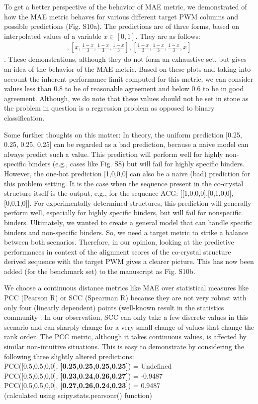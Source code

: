 To get a better perspective of the behavior of MAE metric, we demonstrated of how the MAE metric behaves for various different target PWM columns and possible predictions (Fig. S10a). The predictions are of three forms, based on interpolated values of a variable $x\in[0,1]$. They are as follows: %
\begin{align}
[1-x,0,x,0], [x, \frac{1-x}{3}, \frac{1-x}{3}, \frac{1-x}{3}], [\frac{1-x}{3}, \frac{1-x}{3}, \frac{1-x}{3}, x]
\end{align}
. These demonstrations, although they do not form an exhaustive set, but gives an idea of the behavior of the MAE metric. Based on these plots and taking into account the inherent performance limit computed for this metric, we can consider values less than 0.8 to be of reasonable agreement and below 0.6 to be in good agreement. Although, we do note that these values should not be set in stone as the problem in question is a regression problem as opposed to binary classification.

Some further thoughts on this matter: In theory, the uniform prediction [0.25, 0.25, 0.25, 0.25] can be regarded as a bad prediction, because a naive model can always predict such a value. This prediction will perform well for highly non-specific binders (e.g., cases like Fig. S8) but will fail for highly specific binders. However, the one-hot prediction [1,0,0,0] can also be a naive (bad) prediction for this problem setting. It is the case when the sequence present in the co-crystal structure itself is the output, e.g., for the sequence ACG: [[1,0,0,0],[0,1,0,0],[0,0,1,0]]. For experimentally determined structures, this prediction will generally perform well, especially for highly specific binders, but will fail for nonspecific binders. Ultimately, we wanted to create a general model that can handle specific binders and non-specific binders. So, we need a target metric to strike a balance between both scenarios. Therefore, in our opinion, looking at the predictive performances in context of the alignment scores of the co-crystal structure derived sequence with the target PWM gives a clearer picture. This has now been added (for the benchmark set) to the manuscript as Fig. S10b.

We choose a continuous distance metrics like MAE over statistical measures like PCC (Pearson R) or SCC (Spearman R) because they are not very robust with only four (linearly dependent) points (well-known result in the statistics community \citep{Bonett2000, McIntyre1938}. In our observation, SCC can only take a few discrete values in this scenario and can sharply change for a very small change of values that change the rank order. The PCC metric, although it takes continuous values, is affected by similar non-intuitive situations. This is easy to demonstrate by considering the following three slightly altered predictions:
\\
PCC([0.5,0.5,0,0], \textbf{[0.25,0.25,0.25,0.25]}) = Undefined\\
PCC([0.5,0.5,0,0], \textbf{[0.23,0.24,0.26,0.27]}) = -0.9487\\
PCC([0.5,0.5,0,0], \textbf{[0.27,0.26,0.24,0.23]}) = 0.9487\\
(calculated using scipy.stats.pearsonr() function)

